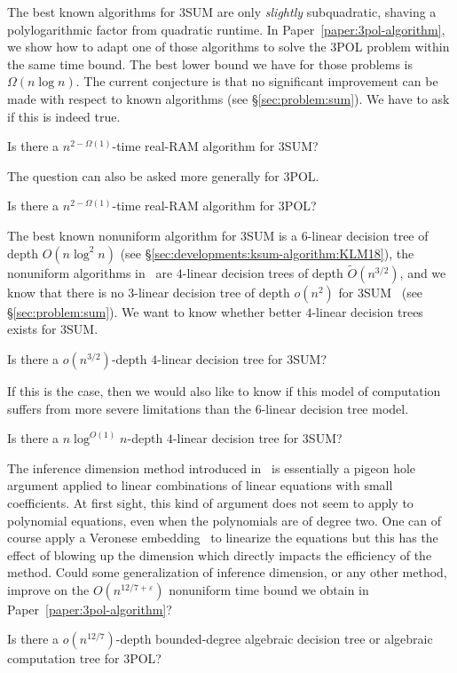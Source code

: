 The best known algorithms for 3SUM are only \emph{slightly} subquadratic,
shaving a polylogarithmic factor from quadratic runtime.
In Paper~\ref{paper:3pol-algorithm}, we show how to adapt one of those
algorithms to solve the 3POL problem within the same time bound.
%
The best lower bound we have for those problems is \(\Omega(n \log n)\). The
current conjecture is that no significant improvement can be made with respect
to known algorithms (see
\S\ref{sec:problem:sum}).
%
We have to ask if this is indeed true.
\begin{openquestion}
	Is there a \(n^{2-\Omega(1)}\)-time real-RAM algorithm for 3SUM?
\end{openquestion}

The question can also be asked more generally for 3POL.
\begin{openquestion}
	Is there a \(n^{2-\Omega(1)}\)-time real-RAM algorithm for 3POL?
\end{openquestion}

The best known nonuniform algorithm for 3SUM is a \(6\)-linear decision tree of
depth \(O(n \log^2 n)\) (see \S\ref{sec:developments:ksum-algorithm:KLM18}),
the nonuniform algorithms in~\cite{GP18,Fr15,GS15} are
\(4\)-linear decision trees of depth \( \tilde{O}(n^{3/2}) \), and we know that
there is no \(3\)-linear decision tree of depth \(o(n^2)\) for
3SUM~\cite{Er99a} (see \S\ref{sec:problem:sum}).
We want to know whether better \(4\)-linear decision trees exists for 3SUM.
\begin{openquestion}
	Is there a \(o(n^{3/2})\)-depth \(4\)-linear decision tree for 3SUM?
\end{openquestion}

If this is the case, then we would also like to know if this model of
computation suffers from more severe limitations than the \(6\)-linear decision tree
model.
\begin{openquestion}
	Is there a \(n \log^{O(1)} n\)-depth \(4\)-linear decision tree for 3SUM?
\end{openquestion}

The inference dimension method introduced in~\cite{KLM18} is essentially a
pigeon hole argument applied to linear combinations of linear equations with small coefficients.
At first sight, this kind of argument does not seem to apply to polynomial
equations, even when the polynomials are of degree two. One can of course apply
a Veronese embedding~\cite{Har77,Har13} to linearize the equations but this has
the effect of blowing up the dimension which directly impacts the efficiency of
the method. Could some generalization of inference dimension, or any other
method,
improve on the \(O(n^{12/7 + \varepsilon})\) nonuniform time bound we obtain in
Paper~\ref{paper:3pol-algorithm}?
\begin{openquestion}
	Is there a \(o(n^{12/7})\)-depth bounded-degree algebraic decision tree or
	algebraic computation tree for 3POL?
\end{openquestion}

